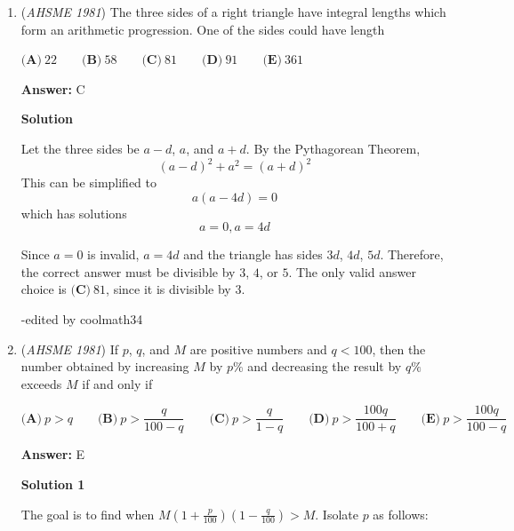 \begin{enumerate}
 \textbf{Answer: }E



\textbf{Solution}

Recall that the reflection of any point $(p, q)$ across the line $y = x$ is $(q, p)$.  Therefore, any point $(p, q)$ lies on $L$ if and only if $(q, p)$ lies on $K$. Therefore, any point $(r, s)$ lies on $K$ if and only if $(s, r)$ lies on $L$, that is, $r=as+b$.  Therefore, line $K$ has equation $x = ay + b$, and isolating $y$ yields $y = \boxed{(\textbf{E})\ \frac{1}{a}x-\frac{b}{a}}$.

 


	\item (\textit{AHSME 1981}) The three sides of a right triangle have integral lengths which form an arithmetic progression. One of the sides could have length


 $\textbf{(A)}\ 22\qquad\textbf{(B)}\ 58\qquad\textbf{(C)}\ 81\qquad\textbf{(D)}\ 91\qquad\textbf{(E)}\ 361$

 \textbf{Answer: }C



\textbf{Solution}

Let the three sides be $a-d$, $a$, and $a+d$.  By the Pythagorean Theorem,
 \[(a-d)^2 + a^2 = (a+d)^2\]This can be simplified to
 \[a(a-4d) = 0\]which has solutions
 \[a = 0, a = 4d\]

 Since $a=0$ is invalid, $a=4d$ and the triangle has sides $3d$, $4d$, $5d$.  Therefore, the correct answer must be divisible by $3$, $4$, or $5$. The only valid answer choice is $\boxed{\textbf{(C)}\ 81}$, since it is divisible by $3$.

 -edited by coolmath34

 


	\item (\textit{AHSME 1981}) If $p$, $q$, and $M$ are positive numbers and $q<100$, then the number obtained by increasing $M$ by $p\%$ and decreasing the result by $q\%$ exceeds $M$ if and only if


 $\textbf{(A)}\ p>q \qquad\textbf{(B)}\ p>\dfrac{q}{100-q}\qquad\textbf{(C)}\ p>\dfrac{q}{1-q}\qquad \textbf{(D)}\ p>\dfrac{100q}{100+q}\qquad\textbf{(E)}\ p>\dfrac{100q}{100-q}$

 \textbf{Answer: }E



\textbf{Solution 1}

The goal is to find when $M\left(1+\frac{p}{100}\right)\left(1-\frac{q}{100}\right) > M$.  Isolate $p$ as follows:


\end{enumerate}
